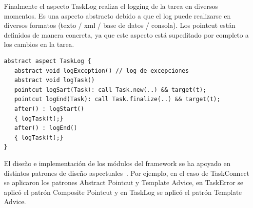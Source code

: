Finalmente el aspecto TaskLog  realiza el logging de la tarea en diversos momentos. Es una aspecto abstracto debido a que el log puede realizarse en diversos formatos (texto / xml / base de datos / consola). Los pointcut están definidos de manera concreta, ya que este aspecto está supeditado por completo a los cambios en la tarea.  
\squeezeup
\begin{verbatim}
abstract aspect TaskLog {
   abstract void logException() // log de excepciones
   abstract void logTask() 
   pointcut logSart(Task): call Task.new(..) && target(t);
   pointcut logEnd(Task): call Task.finalize(..) && target(t);
   after() : logStart()
   { logTask(t);}
   after() : logEnd()
   { logTask(t);}
}
\end{verbatim}
\squeezeup

El diseño e implementación de los módulos del framework se ha apoyado en distintos patrones de diseño aspectuales~\cite{HS2003}. Por ejemplo, en el caso de TaskConnect se aplicaron los patrones Abstract Pointcut y Template Advice, en TaskError se aplicó el patrón Composite Pointcut y en TaskLog se aplicó el patrón Template Advice.